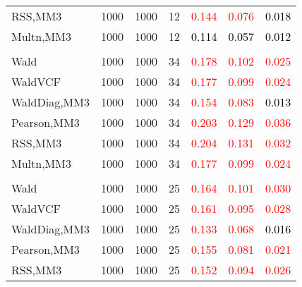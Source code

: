\documentclass[
]{article}
\begin{document}
\begin{table}[H]
{\begin{tabular}[t]{lrrrrrr}
\hspace{1em}RSS,MM3 & 1000 & 1000 & 12 & \textcolor{red}{0.144} & \textcolor{red}{0.076} & \textcolor{black}{0.018}\\
\hspace{1em}Multn,MM3 & 1000 & 1000 & 12 & \textcolor{black}{0.114} & \textcolor{black}{0.057} & \textcolor{black}{0.012}\\
\addlinespace[0.3em]
\multicolumn{7}{l}{\textbf{1F 15V}}\\
\hspace{1em}Wald & 1000 & 1000 & 34 & \textcolor{red}{0.178} & \textcolor{red}{0.102} & \textcolor{red}{0.025}\\
\hspace{1em}WaldVCF & 1000 & 1000 & 34 & \textcolor{red}{0.177} & \textcolor{red}{0.099} & \textcolor{red}{0.024}\\
\hspace{1em}WaldDiag,MM3 & 1000 & 1000 & 34 & \textcolor{red}{0.154} & \textcolor{red}{0.083} & \textcolor{black}{0.013}\\
\hspace{1em}Pearson,MM3 & 1000 & 1000 & 34 & \textcolor{red}{0.203} & \textcolor{red}{0.129} & \textcolor{red}{0.036}\\
\hspace{1em}RSS,MM3 & 1000 & 1000 & 34 & \textcolor{red}{0.204} & \textcolor{red}{0.131} & \textcolor{red}{0.032}\\
\hspace{1em}Multn,MM3 & 1000 & 1000 & 34 & \textcolor{red}{0.177} & \textcolor{red}{0.099} & \textcolor{red}{0.024}\\
\addlinespace[0.3em]
\multicolumn{7}{l}{\textbf{2F 10V}}\\
\hspace{1em}Wald & 1000 & 1000 & 25 & \textcolor{red}{0.164} & \textcolor{red}{0.101} & \textcolor{red}{0.030}\\
\hspace{1em}WaldVCF & 1000 & 1000 & 25 & \textcolor{red}{0.161} & \textcolor{red}{0.095} & \textcolor{red}{0.028}\\
\hspace{1em}WaldDiag,MM3 & 1000 & 1000 & 25 & \textcolor{red}{0.133} & \textcolor{red}{0.068} & \textcolor{black}{0.016}\\
\hspace{1em}Pearson,MM3 & 1000 & 1000 & 25 & \textcolor{red}{0.155} & \textcolor{red}{0.081} & \textcolor{red}{0.021}\\
\hspace{1em}RSS,MM3 & 1000 & 1000 & 25 & \textcolor{red}{0.152} & \textcolor{red}{0.094} & \textcolor{red}{0.026}\\

\end{tabular}}
\end{table}
\end{document}
